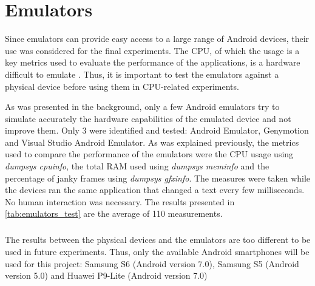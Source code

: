 \documentclass{kththesis}
\begin{document}
    
    \chapter{Emulators}
    \label{annex:emulators}
    
    Since emulators can provide easy access to a large range of Android devices, their use was considered for the final experiments. The CPU, of which the usage is a key metrics used to evaluate the performance of the applications, is a hardware difficult to emulate \cite{cpu_emulator}. Thus, it is important to test the emulators against a physical device before using them in CPU-related experiments.

As was presented in the background, only a few Android emulators try to simulate accurately the hardware capabilities of the emulated device and not improve them. Only 3 were identified and tested: Android Emulator, Genymotion and Visual Studio Android Emulator. As was explained previously, the metrics used to compare the performance of the emulators were the CPU usage using \textit{dumpsys cpuinfo}, the total RAM used using \textit{dumpsys meminfo} and the percentage of janky frames using \textit{dumpsys gfxinfo}. The measures were taken while the devices ran the same application that changed a text every few milliseconds. No human interaction was necessary. The results presented in \autoref{tab:emulators_test} are the average of 110 measurements.

\begin{table}[!ht]
    \caption{Emulators Tests}
    \label{tab:emulators_test}
\end{table}

\paragraph{}
The results between the physical devices and the emulators are too different to be used in future experiments. Thus, only the available Android smartphones will be used for this project: Samsung S6 (Android version 7.0), Samsung S5 (Android version 5.0) and Huawei P9-Lite (Android version 7.0)


\tailmatter
\end{document}
